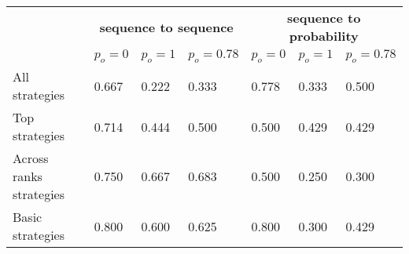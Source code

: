 \begin{tabular}{lllllll}
\toprule
{} & \multicolumn{3}{c}{\textbf{sequence to sequence}} & \multicolumn{3}{c}{\textbf{sequence to probability}} \\
{} &                       $p_o=0$ &                       $p_o=1$ &                    $p_o=0.78$ &                       $p_o=0$ &                       $p_o=1$ &                    $p_o=0.78$ \\
\midrule
All strategies          &  \cellcolor{orange!67.0}0.667 &  \cellcolor{orange!22.0}0.222 &  \cellcolor{orange!33.0}0.333 &  \cellcolor{orange!78.0}0.778 &  \cellcolor{orange!33.0}0.333 &    \cellcolor{orange!50.0}0.500 \\
Top strategies          &  \cellcolor{orange!71.0}0.714 &  \cellcolor{orange!44.0}0.444 &    \cellcolor{orange!50.0}0.500 &    \cellcolor{orange!50.0}0.500 &  \cellcolor{orange!43.0}0.429 &  \cellcolor{orange!43.0}0.429 \\
Across ranks strategies &   \cellcolor{orange!75.0}0.750 &  \cellcolor{orange!67.0}0.667 &  \cellcolor{orange!68.0}0.683 &    \cellcolor{orange!50.0}0.500 &   \cellcolor{orange!25.0}0.250 &    \cellcolor{orange!30.0}0.300 \\
Basic strategies        &    \cellcolor{orange!80.0}0.800 &    \cellcolor{orange!60.0}0.600 &  \cellcolor{orange!62.0}0.625 &    \cellcolor{orange!80.0}0.800 &    \cellcolor{orange!30.0}0.300 &  \cellcolor{orange!43.0}0.429 \\
\bottomrule
\end{tabular}
